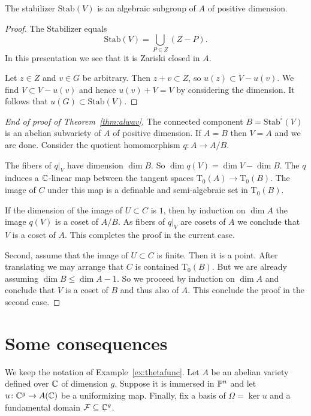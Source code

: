 \begin{lemma}
  The stabilizer $\mathrm{Stab}(V)$ is an algebraic subgroup of $A$ of
  positive dimension.
\end{lemma}
\begin{proof}
  The Stabilizer equals
  \begin{equation*}
    \mathrm{Stab}(V) = \bigcup_{P \in Z} (Z-P).
  \end{equation*}
  In this presentation we see that it is Zariski closed in $A$.
  
  Let $z\in Z$ and $v\in G$ be arbitrary. Then $z+v\subset Z$,
  so $u(z) \subset V-u(v)$. We find $V\subset V-u(v)$ and hence
  $u(v)+V=V$ by considering the dimension.
  It follows that 
    $u(G) \subset\mathrm{Stab}(V)$.  
\end{proof}

\begin{proof}[End of proof of Theorem~\ref{thm:alwav}]
  The connected component $B = \mathrm{Stab}^\circ(V)$ is an abelian
  subvariety of $A$ of positive dimension.
  If $A=B$ then $V=A$ and we are done. 
  Consider the quotient homomorphism $q\colon A\rightarrow A/B$.

  The fibers of $q|_V$ have dimension $\dim B$. So $\dim q(V) = \dim
  V-\dim B$. The $q$ induces a ${\mathbb{C}}$-linear map between the tangent
  spaces $\mathrm{T}_0(A)\rightarrow\mathrm{T}_0(B)$. The image of $C$
  under this map is a definable and semi-algebraic set in
  $\mathrm{T}_0(B)$.

  If the dimension of the image of $U\subset C$ is $1$, then by induction on
  $\dim A$ the image $q(V)$ is a coset
  of $A/B$. As fibers of $q|_V$ are  cosets
  of $A$ we conclude that $V$ is a coset of $A$. This completes the proof in the current
  case.

  Second, assume that the image of $U\subset C$ is finite. Then it is
  a point. After translating we may arrange that $C$ is contained
  $\mathrm{T}_0(B)$. But we are already assuming $\dim B \le \dim
  A-1$. 
  So we proceed by induction on $\dim A$ and conclude that $V$ is a
  coset of $B$ and thus also of $A$. This
  conclude the proof in the second case.
\end{proof}


\section{Some consequences}
\label{sec:conclusionft}

We keep the notation of Example~\ref{ex:thetafunc}. 
Let $A$ be an abelian variety defined over ${\mathbb{C}}$ of dimension $g$. Suppose it is
immersed in ${\mathbb{P}}^n$ and let $u\colon {\mathbb{C}}^{g}\rightarrow A({\mathbb{C}})$ be a
uniformizing map. Finally, fix a basis of $\Omega = \ker u$ and a
fundamental domain ${\mathcal F} \subseteq{\mathbb{C}}^g$.

